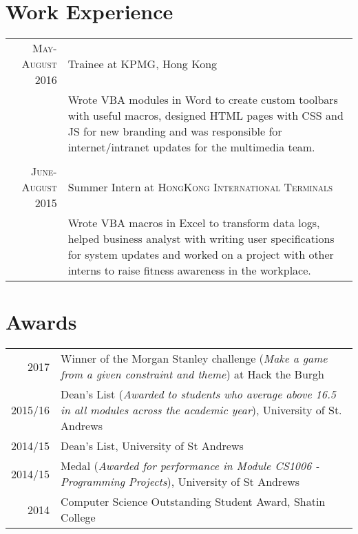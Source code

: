 \documentclass{article}
\begin{document}
\section*{Work Experience}
\begin{tabular}{r|p{15cm}}

\textsc{May-August 2016} & Trainee at \textsc{KPMG}, Hong Kong \\
 
&\footnotesize{Wrote VBA modules in Word to create custom toolbars with useful macros, designed HTML pages with CSS and JS for new branding and was responsible for internet/intranet updates for the multimedia team.}\\\multicolumn{2}{c}{} \\


\textsc{June-August 2015} & Summer Intern at \textsc{HongKong International Terminals} \\

&\footnotesize{Wrote VBA macros in Excel to transform data logs, helped business analyst with writing user specifications for system updates and worked on a project with other interns to raise fitness awareness in the workplace.}\\
\end{tabular}

\section*{Awards}
\begin{tabular}{r|p{17cm}}
\textsc{2017} & Winner of the Morgan Stanley challenge (\textit{Make a game from a given constraint and theme}) at Hack the Burgh\\
\textsc{2015/16} & Dean's List (\textit{Awarded to students who average above 16.5 in all modules across the academic year}), University of St. Andrews \\


\textsc{2014/15} & Dean’s List, University of St Andrews\\

\textsc{2014/15} & Medal (\textit{Awarded for performance in Module CS1006 - Programming Projects}), University of St Andrews\\

\textsc{2014} & Computer Science Outstanding Student Award, Shatin College \\

\end{tabular}
\end{document}
